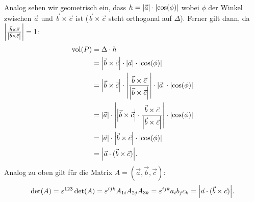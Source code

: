\documentclass{theozettel}
\renewcommand{\epsilon}{\varepsilon}
\newcommand{\vol}{\operatorname{vol}}
\begin{document}
\begin{enumerate}[(F1)]
\begin{figure}[h]
			\end{figure} \\
			Analog sehen wir geometrisch ein, dass $h = \qty|\vec{a}| \cdot \qty|\cos(\phi)|$ wobei $\phi$ der Winkel zwischen $\vec{a}$ und $\vec{b} \times \vec{c}$ ist ($\vec{b} \times \vec{c}$ steht orthogonal auf $\Delta$). Ferner gilt dann, da $\qty|\frac{\vec{b} \times \vec{c}}{\qty|\vec{b} \times \vec{c}|} | = 1$:
			\begin{align*}
				\vol(P) &= \Delta \cdot h  \\
				&= \qty|\vec{b} \times \vec{c}| \cdot \qty|\vec{a}| \cdot \qty|\cos(\phi)| \\
				&= \qty|\vec{b} \times \vec{c}| \cdot \qty|\frac{\vec{b} \times \vec{c}}{\qty|\vec{b} \times \vec{c}|} |\cdot \qty|\vec{a}| \cdot \qty|\cos(\phi)| \\
				&= \qty|\vec{a}| \cdot  \left| \qty|\vec{b} \times \vec{c}| \cdot \frac{\vec{b} \times \vec{c}}{\qty|\vec{b} \times \vec{c}|} \right| \cdot \qty|\cos(\phi)| \\
				&= \qty|\vec{a}| \cdot \qty|\vec{b} \times \vec{c}| \cdot \qty|\cos(\phi)| \\
				&= \qty|\vec{a} \cdot (\vec{b} \times \vec{c}) |.
			\end{align*}
			Analog zu oben gilt für die Matrix $A = (\vec{a},\vec{b},\vec{c})$:
			\begin{align*}
				\det(A) = \epsilon^{123}\det(A) = \epsilon^{ijk}A_{1i}A_{2j}A_{3k} = \epsilon^{ijk}a_{i}b_{j}c_{k} = \qty|\vec{a} \cdot (\vec{b} \times \vec{c})|.
			\end{align*}


\end{enumerate}
\end{document}

